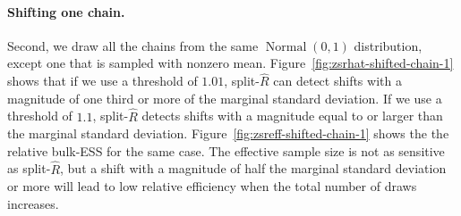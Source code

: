 \documentclass[american,]{article}
\let\oldparagraph\paragraph
\renewcommand{\paragraph}[1]{\oldparagraph{#1}\mbox{}}
\DeclareMathOperator{\N}{Normal}
\theoremstyle{definition}
\begin{document}
\hypertarget{shifting-one-chain}{%
\paragraph{Shifting one chain.}\label{shifting-one-chain}}
Second, we draw all the chains from the same $\N(0, 1)$ distribution,
except one that is sampled with nonzero
mean. Figure~\ref{fig:zsrhat-shifted-chain-1} shows that if we use a
threshold of \(1.01\), split-\(\widehat{R}\) can detect shifts with a
magnitude of one third or more of the marginal standard deviation. If
we use a threshold of \(1.1\), split-\(\widehat{R}\) detects shifts
with a magnitude equal to or larger than the marginal standard
deviation.
%
Figure~\ref{fig:zsreff-shifted-chain-1} shows the the relative
bulk-ESS for the same case. The effective
sample size is not as sensitive as split-\(\widehat{R}\), but a shift
with a magnitude of half the marginal standard deviation or more will
lead to low relative efficiency when the total number of draws
increases.
\end{document}
